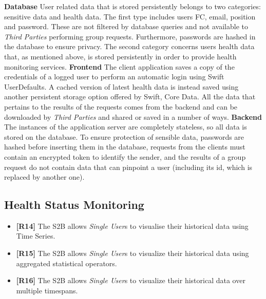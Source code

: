 \documentclass[titlepage]{article}
\begin{document}
	{\bf Database} \newline
	User related data that is stored persistently belongs to two categories: sensitive data and health data. The first type includes user\textsc{}s FC, email, position and password. These are not filtered by database queries and not available to {\it Third Parties} performing group requests. Furthermore, passwords are hashed in the database to ensure privacy. The second category concerns user\textsc{}s health data that, as mentioned above, is stored persistently in order to provide health monitoring services.
	\newline
	\newline
	\noindent
	{\bf Frontend} \newline
	The client application saves a copy of the credentials of a logged user to perform an automatic login using Swift UserDefaults. A cached version of latest health data is instead saved using another persistent storage option offered by Swift, Core Data. All the data that pertains to the results of the requests comes from the backend and can be downloaded by {\it Third Parties} and shared or saved in a number of ways.   
	\newline
	\newline
	\noindent
	{\bf Backend} \newline
	The instances of the application server are completely stateless, so all data is stored on the database. To ensure protection of sensible data, passwords are hashed before inserting them in the database, requests from the clients must contain an encrypted token to identify the sender, and the results of a group request do not contain data that can pinpoint a user (including its id, which is replaced by another one).
	
	
	\subsection{Health Status Monitoring}
	\begin{itemize}
		\item {\bf [R14]} The S2B allows {\it Single User}s to visualise their historical data using Time Series. 
		\item {\bf [R15]} The S2B allows {\it Single User}s to visualize their historical data using aggregated statistical operators. 
		\item {\bf [R16]} The S2B allows {\it Single User}s to visualize their historical data over multiple timespans.
	\end{itemize}	
	
\end{document}
